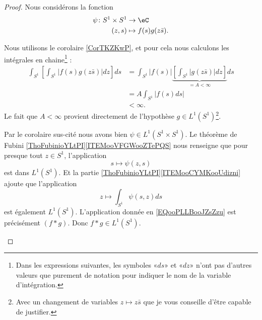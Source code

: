 \begin{proof}
	Nous considérons la fonction
	\begin{equation}
		\begin{aligned}
			\psi\colon S^1\times S^1 & \to \eC                 \\
			(z,s)                    & \mapsto f(s)g(z\bar s).
		\end{aligned}
	\end{equation}
	\begin{subproof}
		Nous utilisons le corolaire \ref{CorTKZKwP}, et pour cela nous calculons les intégrales en chaine\footnote{Dans les expressions suivantes, les symboles «\( ds\)» et «\( dz\)» n'ont pas d'autres valeurs que purement de notation pour indiquer le nom de la variable d'intégration.} :
		\begin{subequations}
			\begin{align}
				\int_{S^1}\left[ \int_{S^1}| f(s)g(z\bar s) |dz \right]ds & =\int_{S^1}| f(s) |\underbrace{\left[ \int_{S^1}| g(z\bar s) |dz \right]}_{=A<\infty}ds \\
				                                                          & =A\int_{S^1}| f(s)ds |                                                                  \\
				                                                          & <\infty.
			\end{align}
		\end{subequations}
		Le fait que \( A<\infty\) provient directement de l'hypothèse \( g\in L^1(S^1)\)\footnote{Avec un changement de variables \( z\mapsto z\bar s\) que je vous conseille d'être capable de justifier.}.

		Par le corolaire sus-cité nous avons bien \( \psi\in L^1(S^1\times S^1)\).
		Le théorème de Fubini \ref{ThoFubinioYLtPI}\ref{ITEMooVFGWooZTePQS} nous renseigne que pour presque tout \( z\in S^1\), l'application
		\begin{equation}
			s\mapsto \psi(z,s)
		\end{equation}
		est dans \( L^1(S^1)\). Et la partie \ref{ThoFubinioYLtPI}\ref{ITEMooCYMKooUdizni} ajoute que l'application
		\begin{equation}        \label{EQooPLLBooJZsZzu}
			z\mapsto \int_{S^1}\psi(s,z)ds
		\end{equation}
		est également \( L^1(S^1)\).
		\spitem[Conclusion]
		L'application donnée en \eqref{EQooPLLBooJZsZzu} est précisément \( (f*g)\). Donc \( f*g\in L^1(S^1)\).
	\end{subproof}
\end{proof}


